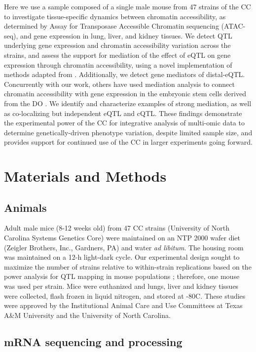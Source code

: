 \documentclass[9pt,twocolumn,twoside]{gsajnl}
\begin{document}
Here we use a sample composed of a single male mouse from 47 strains of the CC to investigate tissue-specific dynamics between chromatin accessibility, as determined by Assay for Transposase Accessible Chromatin sequencing (ATAC-seq), and gene expression in lung, liver, and kidney tissues. We detect QTL underlying gene expression and chromatin accessibility variation across the strains, and assess the support for mediation of the effect of eQTL on gene expression through chromatin accessibility, using a novel implementation of methods adapted from \cite{Chick2016}. Additionally, we detect gene mediators of distal-eQTL. Concurrently with our work, others have used mediation analysis to connect chromatin accessibility with gene expression in the embryonic stem cells derived from the DO \citep{Skelly2019}. We identify and characterize examples of strong mediation, as well as co-localizing but independent eQTL and cQTL. These findings demonstrate the experimental power of the CC for integrative analysis of multi-omic data to determine genetically-driven phenotype variation, despite limited sample size, and provides support for continued use of the CC in larger experiments going forward.

\section{Materials and Methods}
\label{sec:materials:methods}

\subsection{Animals}

Adult male mice (8-12 weeks old) from 47 CC strains (University of North Carolina Systems Genetics Core) were maintained on an NTP 2000 wafer diet (Zeigler Brothers, Inc., Gardners, PA) and water \textit{ad libitum}. The housing room was maintained on a 12-h light-dark cycle. Our experimental design sought to maximize the number of strains relative to within-strain replications based on the power analysis for QTL mapping in mouse populations \citep{Kaeppler1997}; therefore, one mouse was used per strain. Mice were euthanized and lungs, liver and kidney tissues were collected, flash frozen in liquid nitrogen, and stored at -80\degree C. These studies were approved by the Institutional Animal Care and Use Committees at Texas A\&M University and the University of North Carolina.

\subsection{mRNA sequencing and processing}
\end{document}

